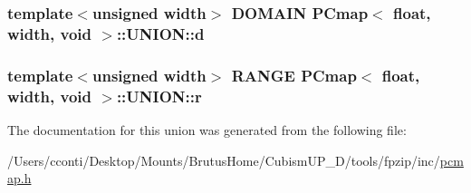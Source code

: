 \subsubsection[{d}]{\setlength{\rightskip}{0pt plus 5cm}template$<$unsigned width$>$ {\bf D\+O\+M\+A\+I\+N} {\bf P\+Cmap}$<$ float, width, void $>$\+::U\+N\+I\+O\+N\+::d}\label{union_p_cmap_3_01float_00_01width_00_01void_01_4_1_1_u_n_i_o_n_a0f44d484ea280730e7c04922e7f260b6}
\hypertarget{union_p_cmap_3_01float_00_01width_00_01void_01_4_1_1_u_n_i_o_n_a8380935472ed21db197fcfd9de45db41}{}
\subsubsection[{r}]{\setlength{\rightskip}{0pt plus 5cm}template$<$unsigned width$>$ {\bf R\+A\+N\+G\+E} {\bf P\+Cmap}$<$ float, width, void $>$\+::U\+N\+I\+O\+N\+::r}\label{union_p_cmap_3_01float_00_01width_00_01void_01_4_1_1_u_n_i_o_n_a8380935472ed21db197fcfd9de45db41}


The documentation for this union was generated from the following file\+:\begin{DoxyCompactItemize}
\item 
/\+Users/cconti/\+Desktop/\+Mounts/\+Brutus\+Home/\+Cubism\+U\+P\+\_\+D/tools/fpzip/inc/\hyperlink{pcmap_8h}{pcmap.\+h}\end{DoxyCompactItemize}
